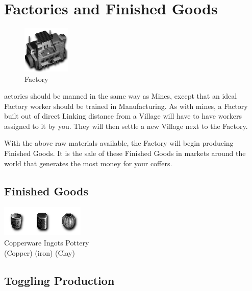 \section{Factories and Finished Goods}

\begin{figure}
	\vspace{-20pt}
	\begin{center}
		\includegraphics[width=0.2\textwidth]{Ifactory}
		\\ Factory
	\end{center}
	\vspace{-50pt}
\end{figure}

actories should be manned in the same way as Mines, except that an ideal Factory worker should be trained in Manufacturing. As with mines, a Factory built out of direct Linking distance from a Village will have to have workers assigned to it by you. They will then settle a new Village next to the Factory.

With the above raw materials available, the Factory will begin producing Finished Goods. It is the sale of these Finished Goods in markets around the world that generates the most money for your coffers.

\subsection{Finished Goods}


\begin{center}
	\includegraphics[width=0.5\linewidth]{Igoods}
	\\ Copperware Ingots Pottery
	\\ (Copper) (iron) (Clay)
\end{center}

\subsection{Toggling Production}


